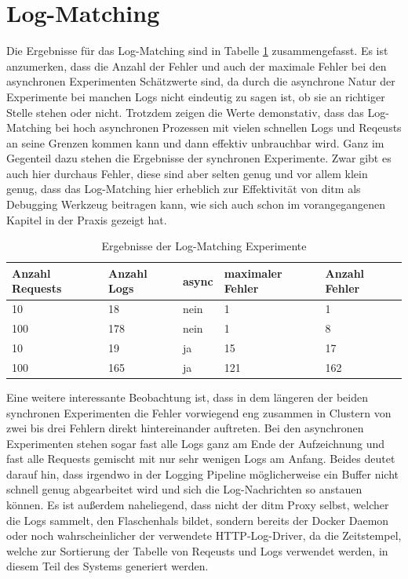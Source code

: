\documentclass[12pt,a4paper]{report}
\begin{document}
\section{Log-Matching}
Die Ergebnisse für das Log-Matching sind in Tabelle \ref{tab:logs} zusammengefasst.
Es ist anzumerken, dass die Anzahl der Fehler und auch der maximale Fehler bei den asynchronen Experimenten Schätzwerte sind, da durch
die asynchrone Natur der Experimente bei manchen Logs nicht eindeutig zu sagen ist, ob sie an richtiger Stelle stehen oder nicht.
Trotzdem zeigen die Werte demonstativ, dass das Log-Matching bei hoch asynchronen Prozessen mit vielen schnellen Logs
und Reqeusts an seine Grenzen kommen kann und dann effektiv unbrauchbar wird. Ganz im Gegenteil dazu stehen die Ergebnisse der
synchronen Experimente. Zwar gibt es auch hier durchaus Fehler, diese sind aber selten genug und vor allem klein genug, dass das Log-Matching
hier erheblich zur Effektivität von ditm als Debugging Werkzeug beitragen kann, wie sich auch schon im vorangegangenen Kapitel in
der Praxis gezeigt hat.
\begin{table}[H]
	\centering
	\caption{Ergebnisse der Log-Matching Experimente}
	\label{tab:logs}
	\begin{tabular}{|l|l|l|l|l|}
		\hline
		Anzahl Requests & Anzahl Logs & async & maximaler Fehler & Anzahl Fehler \\ \hline
		10              & 18          & nein  & 1                & 1             \\ \hline
		100             & 178         & nein  & 1                & 8             \\ \hline
		10              & 19          & ja    & 15               & 17            \\ \hline
		100             & 165         & ja    & 121              & 162           \\ \hline
	\end{tabular}
\end{table}

Eine weitere interessante Beobachtung ist, dass in dem längeren der beiden synchronen Experimenten die Fehler vorwiegend eng zusammen in Clustern
von zwei bis drei Fehlern direkt hintereinander auftreten. Bei den asynchronen Experimenten stehen sogar fast alle Logs ganz am Ende der Aufzeichnung
und fast alle Requests gemischt mit nur sehr wenigen Logs am Anfang. Beides deutet darauf hin, dass irgendwo in der Logging Pipeline möglicherweise
ein Buffer nicht schnell genug abgearbeitet wird und sich die Log-Nachrichten so anstauen können. Es ist außerdem naheliegend, dass nicht der ditm Proxy
selbst, welcher die Logs sammelt, den Flaschenhals bildet, sondern bereits der Docker Daemon oder noch wahrscheinlicher der verwendete HTTP-Log-Driver,
da die Zeitstempel, welche zur Sortierung der Tabelle von Reqeusts und Logs verwendet werden, in diesem Teil des Systems generiert werden.
\end{document}
